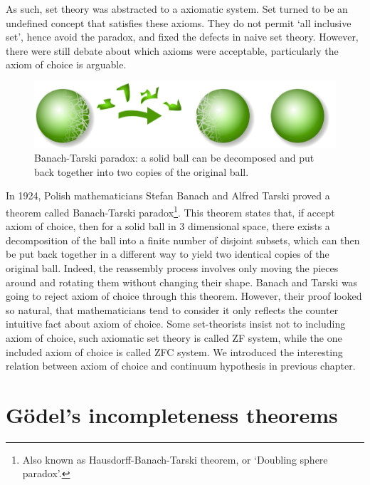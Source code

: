 \documentclass{article}
\begin{document}
As such, set theory was abstracted to a axiomatic system. Set turned to be an undefined concept that satisfies these axioms. They do not permit `all inclusive set', hence avoid the paradox, and fixed the defects in naive set theory. However, there were still debate about which axioms were acceptable, particularly the axiom of choice is arguable.

\begin{figure}[htbp]
 \centering
 \includegraphics[scale=0.6]{img/Banach-Tarski-Paradox.png}
 \caption{Banach-Tarski paradox: a solid ball can be decomposed and put back together into two copies of the original ball.}
 \label{fig:Banach-Tarski-Paradox}
\end{figure}

 
In 1924, Polish mathematicians Stefan Banach and Alfred Tarski proved a theorem called Banach-Tarski paradox\footnote{Also known as Hausdorff-Banach-Tarski theorem, or `Doubling sphere paradox'.}. This theorem states that, if accept axiom of choice, then for a solid ball in 3 dimensional space, there exists a decomposition of the ball into a finite number of disjoint subsets, which can then be put back together in a different way to yield two identical copies of the original ball. Indeed, the reassembly process involves only moving the pieces around and rotating them without changing their shape. Banach and Tarski was going to reject axiom of choice through this theorem. However, their proof looked so natural, that mathematicians tend to consider it only reflects the counter intuitive fact about axiom of choice. Some set-theorists insist not to including axiom of choice, such axiomatic set theory is called ZF system, while the one included axiom of choice is called ZFC system. We introduced the interesting relation between axiom of choice and continuum hypothesis in previous chapter.

\section{Gödel's incompleteness theorems}
\end{document}
